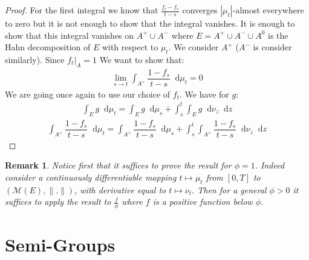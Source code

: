 \documentclass[11pt,a4paper]{article}
\newcommand{\MC}{\mathcal{M}}
\newcommand{\dd}{\mathop{}\!\mathrm{d}}
\newtheorem{remark}[theorem]{Remark}
\begin{document}
\begin{proof}
    For the first integral we know that $\frac{f_{t}-f_s}{t-s}$ converges $|\mu_t|$-almost everywhere to zero but it is not enough to show that the integral vanishes. It is enough to show that this integral vanishes on $A^+\cup A^-$ where $E = A^+ \cup A^- \cup A^0$ is the Hahn decomposition of $E$ with respect to $\mu_t$. We consider $A^+$ ($A^-$ is consider similarly). Since $f_t|_A = 1$ We want to show that:
    \begin{align*}
        \lim\limits_{s\to t}\int_{A^+} \dfrac{1-f_s}{t-s}\dd\mu_{t } = 0
    \end{align*}
    We are going once again to use our choice of $f_t$. We have for $g$:
    \begin{align*}
        \int_E g \dd\mu_t = \int_E g\dd \mu_s + \int_s^t \int_Eg \dd\nu_z \dd z
    \end{align*}
    \begin{align*}
        \int_{A^+} \dfrac{1-f_s}{t-s}\dd\mu_{t }  = \int_{A^+}\dfrac{1-f_s}{t-s}\dd\mu_{s} + \int_s^t \int_{A^+}\dfrac{1-f_s}{t-s}\dd\nu_{z} \dd z
    \end{align*}
    \end{proof}
\begin{remark}
    Notice first that it suffices to prove the result for $\phi = 1$. Indeed consider a continuously differentiable mapping $t\mapsto \mu_t$ from $[0,T]$ to \(\left(\MC(E),\|.\|\right)\), with derivative equal to $t \mapsto\nu_t$. Then for a general $\phi > 0$ it suffices to apply the result to $\frac{f}{\phi}$ where $f$ is a positive function below $\phi$.
\end{remark}

\section{Semi-Groups}\label{section:semi_groups}
\end{document}
